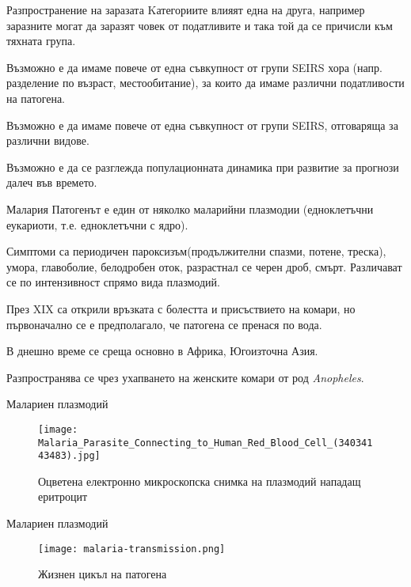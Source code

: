 \begin{frame}[t]{Разпространение на заразата}
  Kатегориите влияят една на друга, например заразните могат да заразят човек от податливите и така той да се причисли към тяхната група.

  Възможно е да имаме повече от една съвкупност от групи SEIRS хора (напр. разделение по възраст, местообитание), за които да имаме различни податливости на патогена.

  Възможно е да имаме повече от една съвкупност от групи SEIRS, отговаряща за различни видове.

  Възможно е да се разглежда популационната динамика при развитие за прогнози далеч във времето.
\end{frame}

\begin{frame}[t]{Малария}
  Патогенът е един от няколко маларийни плазмодии (едноклетъчни еукариоти, т.е. едноклетъчни с ядро).

  Симптоми са периодичен пароксизъм(продължителни спазми, потене, треска), умора, главоболие, белодробен оток, разрастнал се черен дроб, смърт. Различават се по интензивност спрямо вида плазмодий.

  През XIX са открили връзката с болестта и присъствието на комари, но първоначално се е предполагало, че патогена се пренася по вода.

  В днешно време се среща основно в Африка, Югоизточна Азия.
  
  Разпространява се чрез ухапването на женските комари от род \textit{Anopheles}.
\end{frame}

\begin{frame}[t]{Малариен плазмодий}
  \begin{figure}
    \texttt{[image: Malaria\_Parasite\_Connecting\_to\_Human\_Red\_Blood\_Cell\_(34034143483).jpg]}
    \centering
    \caption{Оцветена електронно микроскопска снимка на плазмодий нападащ еритроцит}
  \end{figure}
\end{frame}

\begin{frame}[t]{Малариен плазмодий}
  \begin{figure}
    \texttt{[image: malaria-transmission.png]}
    \centering
    \caption{Жизнен цикъл на патогена}
  \end{figure}
\end{frame}
